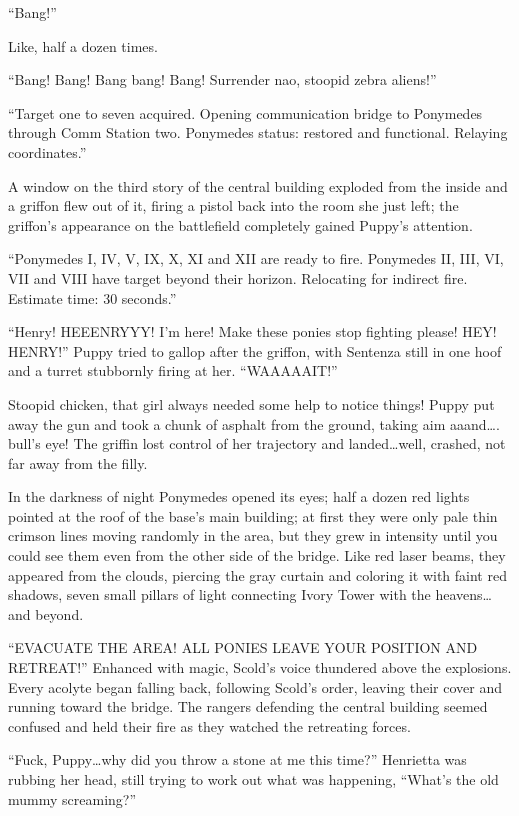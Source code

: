 ``Bang!''

Like, half a dozen times.

``Bang! Bang! Bang bang! Bang! Surrender nao, stoopid zebra aliens!''

``{\mt Target one to seven acquired. Opening communication bridge to Ponymedes through Comm Station two. Ponymedes status: restored and functional. Relaying coordinates.}''

A window on the third story of the central building exploded from the inside and a griffon flew out of it, firing a pistol back into the room she just left; the griffon's appearance on the battlefield completely gained Puppy's attention.

``{\mt Ponymedes I, IV, V, IX, X, XI and XII are ready to fire. Ponymedes II, III, VI, VII and VIII have target beyond their horizon. Relocating for indirect fire. Estimate time: 30 seconds.}''

``Henry! HEEENRYYY! I'm here! Make these ponies stop fighting please! HEY! HENRY!'' Puppy tried to gallop after the griffon, with Sentenza still in one hoof and a turret stubbornly firing at her. ``WAAAAAIT!''

Stoopid chicken, that girl always needed some help to notice things! Puppy put away the gun and took a chunk of asphalt from the ground, taking aim aaand\dots. bull's eye! The griffin lost control of her trajectory and landed\dots well, crashed, not far away from the filly.

In the darkness of night Ponymedes opened its eyes; half a dozen red lights pointed at the roof of the base's main building; at first they were only pale thin crimson lines moving randomly in the area, but they grew in intensity until you could see them even from the other side of the bridge. Like red laser beams, they appeared from the clouds, piercing the gray curtain and coloring it with faint red shadows, seven small pillars of light connecting Ivory Tower with the heavens\dots and beyond.

``EVACUATE THE AREA! ALL PONIES LEAVE YOUR POSITION AND RETREAT!'' Enhanced with magic, Scold's voice thundered above the explosions. Every acolyte began falling back, following Scold's order, leaving their cover and running toward the bridge. The rangers defending the central building seemed confused and held their fire as they watched the retreating forces.

``Fuck, Puppy\dots why did you throw a stone at me this time?'' Henrietta was rubbing her head, still trying to work out what was happening, ``What's the old mummy screaming?''


